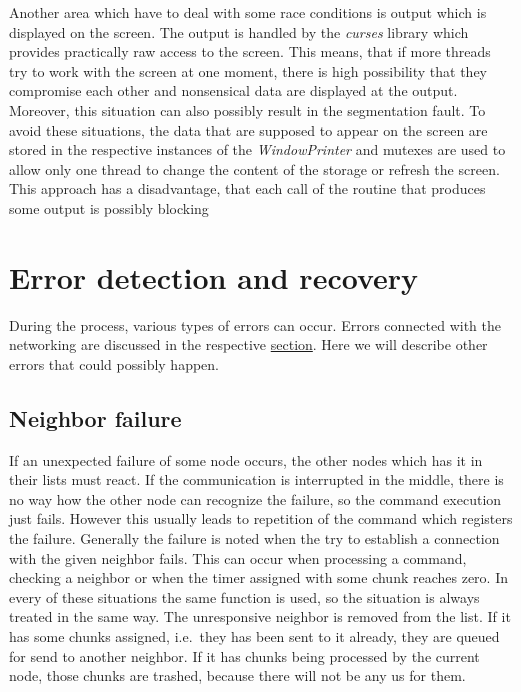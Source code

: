 Another area which have to deal with some race conditions is output
which is displayed on the screen. The output is handled by the
\textit{curses} library which provides practically raw access to the
screen. This means, that if more threads try to work with the screen at
one moment, there is high possibility that they compromise each other
and nonsensical data are displayed at the output. Moreover, this
situation can also possibly result in the segmentation fault. To avoid
these situations, the data that are supposed to appear on the screen are
stored in the respective instances of the \textit{WindowPrinter} and
mutexes are used to allow only one thread to change the content of the
storage or refresh the screen. This approach has a disadvantage, that
each call of the routine that produces some output is possibly blocking

\section{Error detection and
recovery}\label{error-detection-and-recovery}

During the process, various types of errors can occur. Errors connected
with the networking are discussed in the respective
\hyperref[handling-errors]{section}. Here we will describe other errors
that could possibly happen.

\subsection*{Neighbor failure}

If an unexpected failure of some node occurs, the other nodes which has
it in their lists must react. If the communication is interrupted in the
middle, there is no way how the other node can recognize the failure, so
the command execution just fails. However this usually leads to
repetition of the command which registers the failure. Generally the
failure is noted when the try to establish a connection with the given
neighbor fails. This can occur when processing a command, checking a
neighbor or when the timer assigned with some chunk reaches zero. In
every of these situations the same function is used, so the situation is
always treated in the same way. The unresponsive neighbor is removed
from the list. If it has some chunks assigned, i.e.~they has been sent
to it already, they are queued for send to another neighbor. If it has
chunks being processed by the current node, those chunks are trashed,
because there will not be any us for them.

